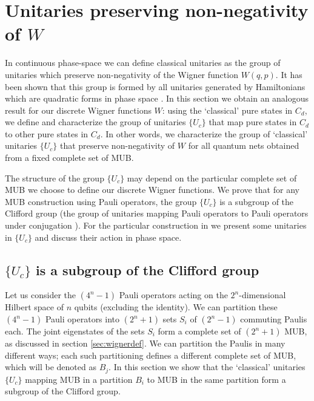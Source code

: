 \documentclass[aps,twocolumn,showpacs,nofootinbib,superscriptaddress]{revtex4}
\begin{document}
\section{Unitaries preserving non-negativity of $W$} \label{secdynamics}

In continuous phase-space we can define classical unitaries as the
group of unitaries which preserve non-negativity of the Wigner
function $W(q,p)$. It has been shown that this group is formed by
all unitaries generated by Hamiltonians which are quadratic forms
in phase space \cite{HilleryOSW84}. In this section we obtain an
analogous result for our discrete Wigner functions $W$: using the
`classical' pure states in $C_d$, we define and characterize the
group of unitaries $\{U_c\}$ that map pure states in $C_d$ to
other pure states in $C_d$. In other words, we characterize the
group of `classical' unitaries $\{U_c\}$ that preserve
non-negativity of $W$ for all quantum nets obtained from a fixed
complete set of MUB.

The structure of the group $\{U_c\}$ may depend on the particular
complete set of MUB we choose to define our discrete Wigner
functions. We prove that for any MUB construction using Pauli
operators, the group $\{U_c\}$ is a subgroup of the Clifford group
(the group of unitaries mapping Pauli operators to Pauli operators
under conjugation \cite{NielsenC00}). For the particular
construction in \cite{GibbonsHW04, PazRS04b} we present some
unitaries in $\{U_c\}$ and discuss their action in phase space.

\subsection{$\{U_c\}$ is a subgroup of the Clifford group}

Let us consider the $(4^n-1)$ Pauli operators acting on the
$2^n$-dimensional Hilbert space of $n$ qubits (excluding the
identity). We can partition these $(4^n-1)$ Pauli operators into
$(2^n+1)$ sets $S_i$ of $(2^n-1)$ commuting Paulis each. The joint
eigenstates of the sets $S_i$ form a complete set of $(2^n+1)$
MUB, as discussed in section \ref{sec:wignerdef}. We can partition
the Paulis in many different ways; each such partitioning defines
a different complete set of MUB, which will be denoted as $B_j$.
In this section we show that the `classical' unitaries $\{U_c\}$
mapping MUB in a partition $B_i$ to MUB in the same partition form
a subgroup of the Clifford group.
\end{document}

